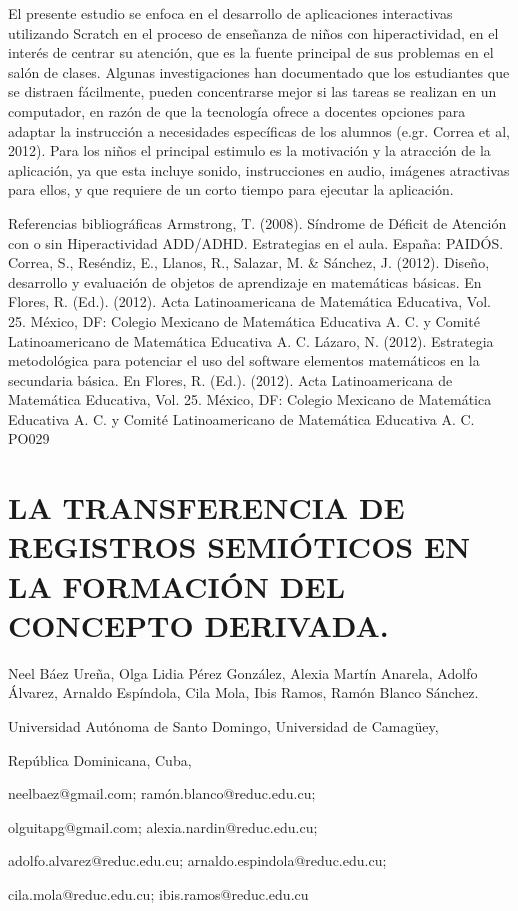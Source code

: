 El presente estudio se enfoca en el desarrollo de aplicaciones interactivas
utilizando Scratch en el proceso de enseñanza de niños con hiperactividad,
en el interés de centrar su atención, que es la fuente principal de
sus problemas en el salón de clases. Algunas investigaciones han documentado
que los estudiantes que se distraen fácilmente, pueden concentrarse
mejor si las tareas se realizan en un computador, en razón de que
la tecnología ofrece a docentes opciones para adaptar la instrucción
a necesidades específicas de los alumnos (e.gr. Correa et al, 2012).
Para los niños el principal estimulo es la motivación y la atracción
de la aplicación, ya que esta incluye sonido, instrucciones en audio,
imágenes atractivas para ellos, y que requiere de un corto tiempo
para ejecutar la aplicación.

Referencias bibliográficas Armstrong, T. (2008). Síndrome de Déficit
de Atención con o sin Hiperactividad ADD/ADHD. Estrategias en el aula.
España: PAIDÓS. Correa, S., Reséndiz, E., Llanos, R., Salazar, M.
\& Sánchez, J. (2012). Diseño, desarrollo y evaluación de objetos
de aprendizaje en matemáticas básicas. En Flores, R. (Ed.). (2012).
Acta Latinoamericana de Matemática Educativa, Vol. 25. México, DF:
Colegio Mexicano de Matemática Educativa A. C. y Comité Latinoamericano
de Matemática Educativa A. C. Lázaro, N. (2012). Estrategia metodológica
para potenciar el uso del software elementos matemáticos en la secundaria
básica. En Flores, R. (Ed.). (2012). Acta Latinoamericana de Matemática
Educativa, Vol. 25. México, DF: Colegio Mexicano de Matemática Educativa
A. C. y Comité Latinoamericano de Matemática Educativa A. C. PO029 


\section{LA TRANSFERENCIA DE REGISTROS SEMIÓTICOS EN LA FORMACIÓN DEL CONCEPTO
DERIVADA. }

\begin{datos}

Neel Báez Ureña, Olga Lidia Pérez González, Alexia Martín Anarela,
Adolfo Álvarez, Arnaldo Espíndola, Cila Mola, Ibis Ramos, Ramón Blanco
Sánchez.

Universidad Autónoma de Santo Domingo, Universidad de Camagüey,

República Dominicana, Cuba,

neelbaez@gmail.com; ramón.blanco@reduc.edu.cu;

olguitapg@gmail.com; alexia.nardin@reduc.edu.cu;

adolfo.alvarez@reduc.edu.cu; arnaldo.espindola@reduc.edu.cu; 

cila.mola@reduc.edu.cu; ibis.ramos@reduc.edu.cu 

\end{datos}

